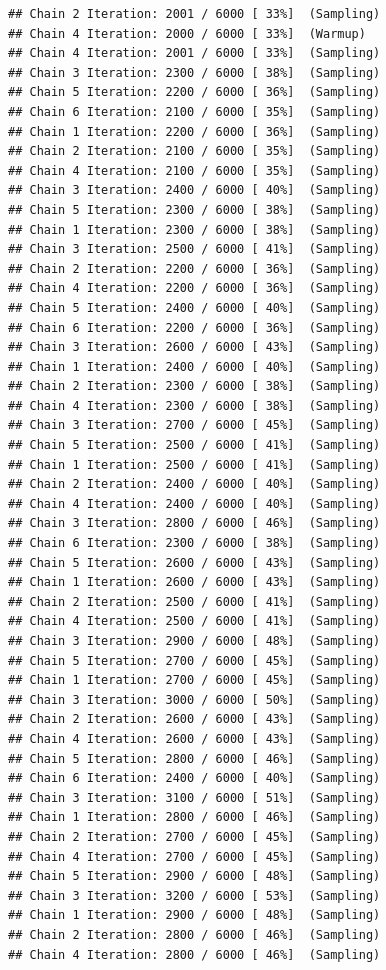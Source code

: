\documentclass[
]{article}
\begin{document}
\begin{verbatim}
## Chain 2 Iteration: 2001 / 6000 [ 33%]  (Sampling) 
## Chain 4 Iteration: 2000 / 6000 [ 33%]  (Warmup) 
## Chain 4 Iteration: 2001 / 6000 [ 33%]  (Sampling) 
## Chain 3 Iteration: 2300 / 6000 [ 38%]  (Sampling) 
## Chain 5 Iteration: 2200 / 6000 [ 36%]  (Sampling) 
## Chain 6 Iteration: 2100 / 6000 [ 35%]  (Sampling) 
## Chain 1 Iteration: 2200 / 6000 [ 36%]  (Sampling) 
## Chain 2 Iteration: 2100 / 6000 [ 35%]  (Sampling) 
## Chain 4 Iteration: 2100 / 6000 [ 35%]  (Sampling) 
## Chain 3 Iteration: 2400 / 6000 [ 40%]  (Sampling) 
## Chain 5 Iteration: 2300 / 6000 [ 38%]  (Sampling) 
## Chain 1 Iteration: 2300 / 6000 [ 38%]  (Sampling) 
## Chain 3 Iteration: 2500 / 6000 [ 41%]  (Sampling) 
## Chain 2 Iteration: 2200 / 6000 [ 36%]  (Sampling) 
## Chain 4 Iteration: 2200 / 6000 [ 36%]  (Sampling) 
## Chain 5 Iteration: 2400 / 6000 [ 40%]  (Sampling) 
## Chain 6 Iteration: 2200 / 6000 [ 36%]  (Sampling) 
## Chain 3 Iteration: 2600 / 6000 [ 43%]  (Sampling) 
## Chain 1 Iteration: 2400 / 6000 [ 40%]  (Sampling) 
## Chain 2 Iteration: 2300 / 6000 [ 38%]  (Sampling) 
## Chain 4 Iteration: 2300 / 6000 [ 38%]  (Sampling) 
## Chain 3 Iteration: 2700 / 6000 [ 45%]  (Sampling) 
## Chain 5 Iteration: 2500 / 6000 [ 41%]  (Sampling) 
## Chain 1 Iteration: 2500 / 6000 [ 41%]  (Sampling) 
## Chain 2 Iteration: 2400 / 6000 [ 40%]  (Sampling) 
## Chain 4 Iteration: 2400 / 6000 [ 40%]  (Sampling) 
## Chain 3 Iteration: 2800 / 6000 [ 46%]  (Sampling) 
## Chain 6 Iteration: 2300 / 6000 [ 38%]  (Sampling) 
## Chain 5 Iteration: 2600 / 6000 [ 43%]  (Sampling) 
## Chain 1 Iteration: 2600 / 6000 [ 43%]  (Sampling) 
## Chain 2 Iteration: 2500 / 6000 [ 41%]  (Sampling) 
## Chain 4 Iteration: 2500 / 6000 [ 41%]  (Sampling) 
## Chain 3 Iteration: 2900 / 6000 [ 48%]  (Sampling) 
## Chain 5 Iteration: 2700 / 6000 [ 45%]  (Sampling) 
## Chain 1 Iteration: 2700 / 6000 [ 45%]  (Sampling) 
## Chain 3 Iteration: 3000 / 6000 [ 50%]  (Sampling) 
## Chain 2 Iteration: 2600 / 6000 [ 43%]  (Sampling) 
## Chain 4 Iteration: 2600 / 6000 [ 43%]  (Sampling) 
## Chain 5 Iteration: 2800 / 6000 [ 46%]  (Sampling) 
## Chain 6 Iteration: 2400 / 6000 [ 40%]  (Sampling) 
## Chain 3 Iteration: 3100 / 6000 [ 51%]  (Sampling) 
## Chain 1 Iteration: 2800 / 6000 [ 46%]  (Sampling) 
## Chain 2 Iteration: 2700 / 6000 [ 45%]  (Sampling) 
## Chain 4 Iteration: 2700 / 6000 [ 45%]  (Sampling) 
## Chain 5 Iteration: 2900 / 6000 [ 48%]  (Sampling) 
## Chain 3 Iteration: 3200 / 6000 [ 53%]  (Sampling) 
## Chain 1 Iteration: 2900 / 6000 [ 48%]  (Sampling) 
## Chain 2 Iteration: 2800 / 6000 [ 46%]  (Sampling) 
## Chain 4 Iteration: 2800 / 6000 [ 46%]  (Sampling) 

\end{verbatim}
\end{document}
